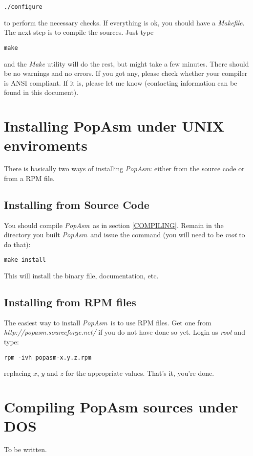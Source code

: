 \documentclass[a4paper,12pt]{book}
\newcommand{\popasm}{\emph{PopAsm}}
\begin{document}
\begin{verbatim}
./configure
\end{verbatim}

to perform the necessary checks. If everything is ok, you should have a
\emph{Makefile}. The next
step is to compile the sources. Just type

\begin{verbatim}
make
\end{verbatim}

and the \emph{Make} utility will do the rest, but might take a few
minutes. There should be no
warnings and no errors. If you got any, please check whether your
compiler is ANSI compliant. If
it is, please let me know (contacting information can be found in this
document).

\section{Installing PopAsm under UNIX enviroments}

There is basically two ways of installing \popasm: either from
the source code or from a
RPM file.

\subsection{Installing from Source Code}
You should compile \popasm\ as in section \ref{COMPILING}. Remain
in the directory you built
\popasm\ and issue the command (you will need to be \emph{root} to
do that):

\begin{verbatim}
make install
\end{verbatim}

This will install the binary file, documentation, etc.

\subsection{Installing from RPM files}
The easiest way to install \popasm\ is to use RPM files. Get one
from
\emph{http://popasm.sourceforge.net/} if you do not have done so yet.
Login as \emph{root} and
type:

\begin{verbatim}
rpm -ivh popasm-x.y.z.rpm
\end{verbatim}

replacing $x$, $y$ and $z$ for the appropriate values. That's it,
you're done.

\section{Compiling PopAsm sources under DOS}
To be written.
\end{document}
